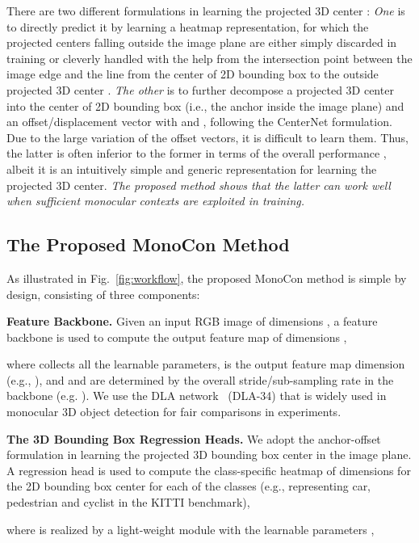 \documentclass[letterpaper]{article} \usepackage{aaai22}  \usepackage{times}  \usepackage{helvet}  \usepackage{courier}  \usepackage[hyphens]{url}  \usepackage{graphicx} \urlstyle{rm} \def\UrlFont{\rm}  \usepackage{natbib}  \usepackage{caption} \DeclareCaptionStyle{ruled}{labelfont=normalfont,labelsep=colon,strut=off} \frenchspacing  \setlength{\pdfpagewidth}{8.5in}  \setlength{\pdfpageheight}{11in}  \usepackage{algorithm}
\begin{document}
There are two different formulations in learning the projected 3D center : \textit{One} is to directly predict it by learning a heatmap representation, for which the projected centers falling outside the image plane are either simply discarded in training \cite{smoke, monodle} or cleverly handled with the help from the intersection point between the image edge and the line from the center of 2D bounding box to the outside projected 3D center \cite{monoflex}. \textit{The other} is to further decompose a projected 3D center into the center of 2D bounding box  (i.e., the anchor inside the image plane) and an offset/displacement vector  with  and , following the CenterNet \cite{centernet} formulation. Due to the large variation of the offset vectors, it is difficult to learn them. Thus, the latter is often inferior to the former in terms of the overall performance \cite{monoflex, monodle}, albeit it is an intuitively simple and generic representation for learning the projected 3D center. \textit{The proposed method shows that the latter can work well when sufficient monocular contexts are exploited in training. }

\subsection{The Proposed MonoCon Method}

As illustrated in Fig.~\ref{fig:workflow}, the proposed MonoCon method is simple by design, consisting of three components: 

\textbf{Feature Backbone.} Given an input RGB image  of dimensions , a feature backbone  is used to compute the output feature map  of dimensions , 

where  collects all the learnable parameters,  is the output feature map dimension (e.g., ), and  and  are determined by the overall stride/sub-sampling rate  in the backbone (e.g. ). We use the DLA network~\cite{dla} (DLA-34) that is widely used in monocular 3D object detection for fair comparisons in experiments. 

\textbf{The 3D Bounding Box Regression Heads.} We adopt the anchor-offset formulation in learning the projected 3D bounding box center  in the image plane. {A regression head} is used to compute the class-specific heatmap  of dimensions   for the 2D bounding box center  for each of the  classes (e.g.,  representing car, pedestrian and cyclist in the KITTI benchmark), 

where  is realized by a light-weight module with the learnable parameters , 
\end{document}
